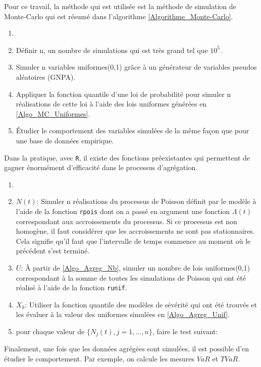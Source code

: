 	Pour ce travail, la méthode qui est utilisée est la méthode de simulation de Monte-Carlo qui est résumé dans l'algorithme \ref{Algorithme_Monte-Carlo}.
	\begin{Algorithme}\label{Algorithme_Monte-Carlo}
		\begin{enumerate}
		\item [ ]
		\item Définir n, un nombre de simulations qui est très grand tel que $10^5$.
		\item Simuler n variables uniformes(0,1) grâce à un générateur de variables pseudos aléatoires (GNPA).\label{Algo_MC_Uniformes}
		\item Appliquer la fonction quantile d'une loi de probabilité pour simuler n réalisations de cette loi à l'aide des lois uniformes générées en \ref{Algo_MC_Uniformes}.
		\item Étudier le comportement des variables simulées de la même façon que pour une base de données empirique.
		\end{enumerate}	
	\end{Algorithme}

	Dans la pratique, avec \texttt{R}, il existe des fonctions préexistantes qui permettent de gagner énormément d'efficacité dans le processus d'agrégation.
	
	\begin{Algorithme}
		\begin{enumerate}
			\item []
			\item $N(t)$: Simuler n réalisations du processus de Poisson définit par le modèle à l'aide de la fonction \texttt{rpois} dont on a passé en argument une fonction $\Lambda(t)$ correspondant aux accroissements du processus. Si ce processus est non homogène, il faut considérer que les accroissements ne sont pas stationnaires. Cela signifie qu'il faut que l'intervalle de temps commence au moment où le précédent s'est terminé. \label{Algo_Agreg_Nb}
			\item $U$: À partir de \ref{Algo_Agreg_Nb}, simuler un nombre de lois uniformes(0,1) correspondant à la somme de toutes les simulations de Poisson qui ont été réalisé à l'aide de la fonction \texttt{runif}.\label{Algo_Agreg_Unif}
			\item $X_k$: Utiliser la fonction quantile des modèles de sévérité qui ont été trouvés et les évaluer à la valeur des uniformes simulées en \ref{Algo_Agreg_Unif}.
			\item pour chaque valeur de $\{N_j(t),j=1,...,n\}$, faire le test suivant: 
		\end{enumerate}
	\end{Algorithme}

Finalement, une fois que les données agrégées sont simulées, il est possible d'en étudier le comportement. Par exemple, on calcule les mesures $VaR$ et $TVaR$.
	